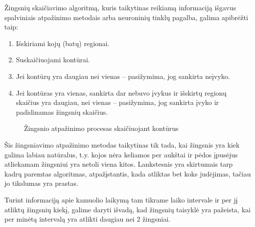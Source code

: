 \documentclass{VUMIFPSbakalaurinis}
\begin{document}
Žingsnių skaičiavimo algoritmą, kuris taikytinas reikiamą informaciją išgavus spalviniais atpažinimo metodais arba neuroninių tinklų pagalba, galima apibrėžti taip:

\begin{enumerate}
	\item Išskiriami kojų (batų) regionai.
	\item Suskaičiuojami kontūrai.
	\item Jei kontūrų yra daugiau nei vienas – pasižymima, jog sankirta neįvyko. 
	\item Jei kontūras yra vienas, sankirta dar nebuvo įvykus ir išskirtų regionų skaičius yra daugiau, nei vienas – pasižymima, jog sankirta įvyko ir padidinamas žingsnių skaičius. 
\end{enumerate}

\begin{figure}[H]
	\centering
	\qquad
	\qquad
	\caption{Žingsnio atpažinimo procesas skaičiuojant kontūrus}
	\label{fig:hand_and_ball}
\end{figure}

Šis žingsniavimo atpažinimo metodas taikytinas tik tada, kai žingsnis yra kiek galima labiau natūralus, t.y. kojos nėra keliamos per aukštai ir pėdos įpusėjus atliekamam žingsniui yra netoli viena kitos. Lankstesnis yra skirtumais tarp kadrų paremtas algoritmas, atpažįstantis, kada atliktas bet koks judėjimas, tačiau jo tikslumas yra prastas.

Turint informaciją apie kamuolio laikymą tam tikrame laiko intervale ir per jį atliktų žingsnių kiekį, galime daryti išvadą, kad žingsnių taisyklė yra pažeista, kai per minėtą intervalą yra atlikti daugiau nei 2 žingsniai. 
\end{document}
